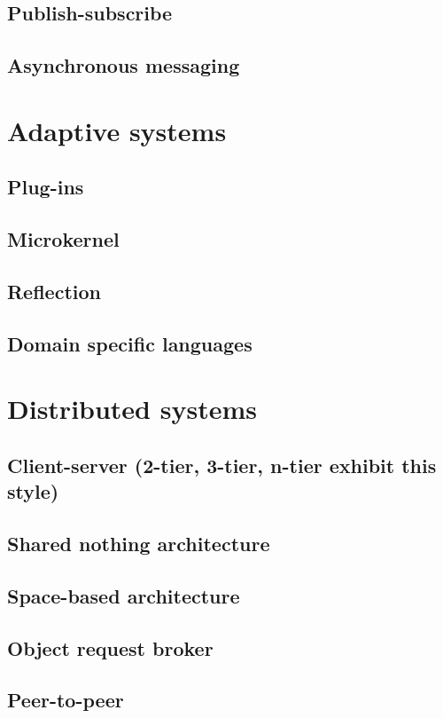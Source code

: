\documentclass{book}
\begin{document}
\section{Publish-subscribe}
\section{Asynchronous messaging}

\chapter{Adaptive systems}

\section{Plug-ins}
\section{Microkernel}
\section{Reflection}
\section{Domain specific languages}

\chapter{Distributed systems}

\section{Client-server (2-tier, 3-tier, n-tier exhibit this style)}
\section{Shared nothing architecture}
\section{Space-based architecture}
\section{Object request broker}
\section{Peer-to-peer}
\end{document}
